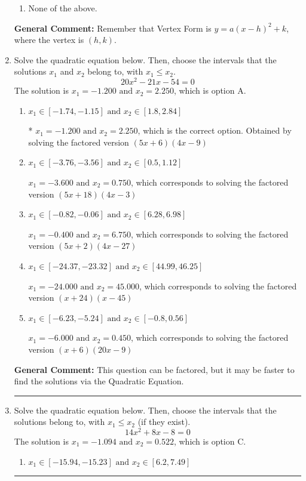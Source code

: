 \documentclass{extbook}[14pt]
\newcommand{\litem}[1]{\item #1

\rule{\textwidth}{0.4pt}}
\begin{document}
\begin{enumerate}
{\begin{enumerate}[label=\Alph*.]
\begin{multicols}{2}
\end{multicols}\item None of the above.\end{enumerate}
\textbf{General Comment:} Remember that Vertex Form is $y = a(x-h)^2+k$, where the vertex is $(h, k)$.
}
\litem{
Solve the quadratic equation below. Then, choose the intervals that the solutions $x_1$ and $x_2$ belong to, with $x_1 \leq x_2$.
\[ 20x^{2} -21 x -54 = 0 \]The solution is \( x_1 = -1.200 \text{ and } x_2 = 2.250 \), which is option A.\begin{enumerate}[label=\Alph*.]
\item \( x_1 \in [-1.74, -1.15] \text{ and } x_2 \in [1.8, 2.84] \)

* $x_1 = -1.200 \text{ and } x_2 = 2.250$, which is the correct option. Obtained by solving the factored version $(5x + 6)(4x -9)$
\item \( x_1 \in [-3.76, -3.56] \text{ and } x_2 \in [0.5, 1.12] \)

$x_1 = -3.600 \text{ and } x_2 = 0.750$, which corresponds to solving the factored version $(5x + 18)(4x -3)$
\item \( x_1 \in [-0.82, -0.06] \text{ and } x_2 \in [6.28, 6.98] \)

$x_1 = -0.400 \text{ and } x_2 = 6.750$, which corresponds to solving the factored version $(5x + 2)(4x -27)$
\item \( x_1 \in [-24.37, -23.32] \text{ and } x_2 \in [44.99, 46.25] \)

$x_1 = -24.000 \text{ and } x_2 = 45.000$, which corresponds to solving the factored version $(x + 24)(x -45)$
\item \( x_1 \in [-6.23, -5.24] \text{ and } x_2 \in [-0.8, 0.56] \)

$x_1 = -6.000 \text{ and } x_2 = 0.450$, which corresponds to solving the factored version $(x + 6)(20x -9)$
\end{enumerate}

\textbf{General Comment:} This question can be factored, but it may be faster to find the solutions via the Quadratic Equation.
}
\litem{
Solve the quadratic equation below. Then, choose the intervals that the solutions belong to, with $x_1 \leq x_2$ (if they exist).
\[ 14x^{2} +8 x -8 = 0 \]The solution is \( x_1 = -1.094 \text{ and } x_2 = 0.522 \), which is option C.\begin{enumerate}[label=\Alph*.]
\item \( x_1 \in [-15.94, -15.23] \text{ and } x_2 \in [6.2, 7.49] \)


\end{enumerate}}
\end{enumerate}
\end{document}
